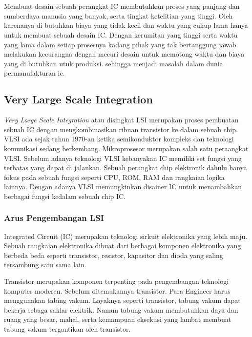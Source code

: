 \chapter{\babDua}
Membuat desain sebuah perangkat IC membutuhkan proses yang panjang dan sumberdaya manusia yang banyak, serta tingkat ketelitian yang tinggi. Oleh karenanya di butuhkan biaya yang tidak kecil dan waktu yang cukup lama hanya untuk membuat sebuah desain IC. Dengan kerumitan yang tinggi serta waktu yang lama dalam setiap prosesnya kadang pihak yang tak bertanggung jawab melakukan kecurangna dengan mecuri desain untuk memotong waktu dan biaya yang di butuhkan utuk produksi. sehingga menjadi masalah dalam dunia permanufakturan ic. \cite{Azriel2017, Basak2017, Bidmeshki2017, Chen2017, Chen2017a, Dellosa2017, Guo2017, Jin2017, Lin2017, Matters2017, Matters2017a, Mohanty2017, Mohanty2017a, Ngo2017, Ngo2017a, Of2017, Sengupta2017a, Sengupta2017b, Sengupta2017, Tsai2017, Veeranna2017, Wehlack2017, Yasin2017, Zhang2017a, Zhang2017, Zhang2017b}

\section{Very Large Scale Integration}
\textit{Very Large Scale Integration} atau disingkat LSI merupakan proses pembuatan sebuah IC dengan mengkombinasikan ribuan transistor ke dalam sebuah chip. VLSI ada sejak tahun 1970-an ketika semikonduktor kompleks dan teknologi komunikasi sedang berkembang. Mikroprosesor merupakan salah satu peraangkat VLSI. Sebelum adanya teknologi VLSI kebanyakan IC memiliki set fungsi yang terbatas yang dapat di jalankan. Sebuah perangkat chip elektronik dahulu hanya fokus pada sebuah fungsi seperti CPU, ROM, RAM dan rangkaian logika lainnya. Dengan adanya VLSI memungkinkan disainer IC untuk menambahkan berbagai fungsi kedalam sebuah chip IC. \cite{vlsi.hist} 

\subsection{Arus Pengembangan LSI}
Integrated Circuit (IC) merupakan teknologi sirkuit elektronika yang lebih maju. Sebuah rangkaian elektronika dibuat dari berbagai komponen elektronika yang berbeda beda seperti transistor, resistor, kapasitor dan dioda yang saling tersambung satu sama lain. \cite{vlsi.hist}

Transistor merupakan komponen terpenting pada pengembangan teknologi komputer moderen. Sebelum ditemukannya transistor. Para Engineer harus menggunakan tabing vakum. Layaknya seperti transistor, tabung vakum dapat bekerja sebaga saklar elektrik. Namun tabung vakum membutuhkan daya dan ruang yang besar, mahal, serta kemampuan eksekusi yang lambat membuat tabung vakum tergantikan oleh transistor.

